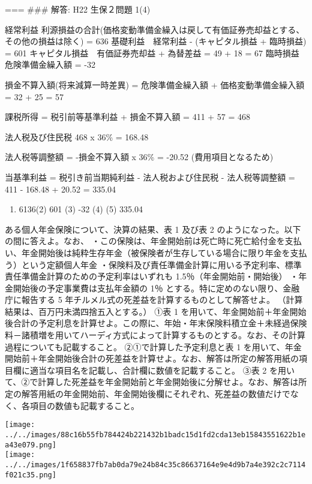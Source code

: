 \documentclass[report,gutter=10mm,fore-edge=10mm,uplatex,dvipdfmx]{jlreq}
\begin{document}
=== \#\#\# 解答: H22 生保２問題 1(4)

経常利益
利源損益の合計(価格変動準備金繰入は戻して有価証券売却益とする、その他の損益は除く)
= 636 基礎利益　経常利益 - (キャピタル損益 + 臨時損益) = 601
キャピタル損益　有価証券売却益 + 為替差益 = 49 + 18 = 67
臨時損益　危険準備金繰入額 = -32

損金不算入額(将来減算一時差異) = 危険準備金繰入額 + 価格変動準備金繰入額
= 32 + 25 = 57

課税所得 = 税引前等基準利益 + 損金不算入額 = 411 + 57 = 468

法人税及び住民税 468 x 36\% = 168.48

法人税等調整額 = -損金不算入額 x 36\% = -20.52 (費用項目となるため)

当基準利益 = 税引き前当期純利益 - 法人税および住民税 - 法人税等調整額 =
411 - 168.48 + 20.52 = 335.04

\begin{enumerate}
\tightlist
\item
  6136(2) 601 (3) -32 (4) (5) 335.04
\end{enumerate}


ある個人年金保険について、決算の結果、表 1 及び表 2
のようになった。以下の間に答えよ。なお、
・この保険は、年金開始前は死亡時に死亡給付金を支払い、年金開始後は純粋生存年金（被保険者が生存している場合に限り年金を支払う）という定額個人年金
・保険料及び責任準備金計算に用いる予定利率、標準責任準備金計算のための予定利率はいずれも
1.5％（年金開始前・開始後） ・年金開始後の予定事業費は支払年金額の 1％
とする。特に定めのない限り、金融庁に報告する 5
年チルメル式の死差益を計算するものとして解答せよ。
（計算結果は、百万円未満四捨五入とする。） ①表 1
を用いて、年金開始前＋年金開始後合計の予定利息を計算せよ。この際に、年始・年末保険料積立金＋未経過保険料－諸積増を用いてハーディ方式によって計算するものとする。なお、その計算過程についても記載すること。
②①で計算した予定利息と表 1
を用いて、年金開始前＋年金開始後合計の死差益を計算せよ。なお、解答は所定の解答用紙の項目欄に適当な項目名を記載し、合計欄に数値を記載すること。
③表 2
を用いて、②で計算した死差益を年金開始前と年金開始後に分解せよ。なお、解答は所定の解答用紙の年金開始前、年金開始後欄にそれぞれ、死差益の数値だけでなく、各項目の数値も記載すること。

\texttt{[image: ../../images/88c16b55fb784424b221432b1badc15d1fd2cda13eb15843551622b1ea43e079.png]}\\
\texttt{[image: ../../images/1f658837fb7ab0da79e24b84c35c86637164e9e4d9b7a4e392c2c7114f021c35.png]}
\end{document}
